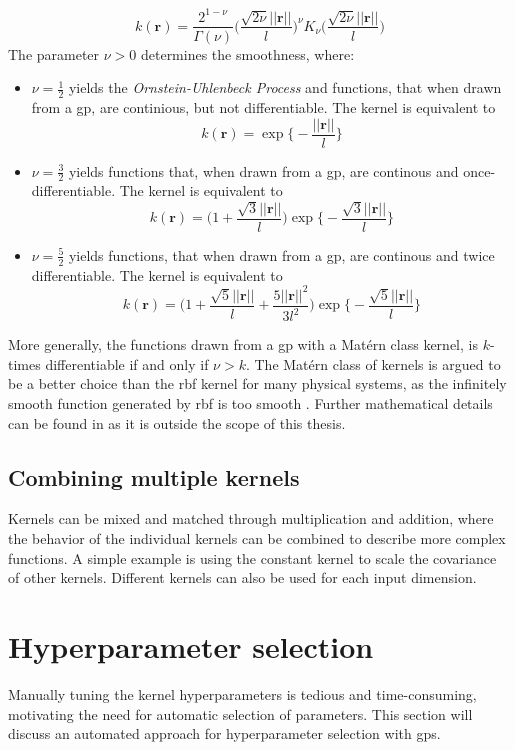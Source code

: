\begin{equation}\label{eq:kernel_matern}
    k(\boldsymbol{r}) = \frac{2^{1-\nu}}{\Gamma(\nu)}\bigg(\frac{\sqrt{2 \nu} ||\boldsymbol{r}||}{l} \bigg)^\nu K_\nu \bigg(\frac{\sqrt{2\nu} || \boldsymbol{r}||}{l} \bigg)
\end{equation}
The parameter $\nu > 0$ determines the smoothness, where:
\begin{itemize}
    \item $\nu=\frac{1}{2}$ yields the \textit{Ornstein-Uhlenbeck Process} and functions, that when drawn from a \acrshort{gp}, are continious, but not differentiable. The kernel is equivalent to $$k(\boldsymbol{r}) = \exp \big\{-\frac{||\boldsymbol{r}||}{l}\big\}$$
    \item $\nu=\frac{3}{2}$ yields functions that, when drawn from a \acrshort{gp}, are continous and once-differentiable. The kernel is equivalent to $$k(\boldsymbol{r}) = \big(1 + \frac{\sqrt{3} ||\boldsymbol{r}||}{l}\big) \exp\big\{- \frac{\sqrt{3} ||\boldsymbol{r}||}{l}\big\}$$
    \item $\nu=\frac{5}{2}$ yields functions, that when drawn from a \acrshort{gp},  are continous and twice differentiable. The kernel is equivalent to $$k(\boldsymbol{r}) = \big(1 + \frac{\sqrt{5} ||\boldsymbol{r}||}{l} + \frac{5 ||\boldsymbol{r}||^2}{3 l^2}\big) \exp\big\{- \frac{\sqrt{5} ||\boldsymbol{r}||}{l}\big\}$$
\end{itemize}
More generally, the functions drawn from a \acrshort{gp} with a Matérn class kernel, is $k$-times differentiable if and only if $\nu > k$\cite{rasmussen}. The Matérn class of kernels is argued to be a better choice than the \acrshort{rbf} kernel for many physical systems, as the infinitely smooth function generated by \acrshort{rbf} is too smooth \cite{rasmussen}.
Further mathematical details can be found in \cite[sec.~4.2]{rasmussen} as it is outside the scope of this thesis.


\subsection{Combining multiple kernels}
Kernels can be mixed and matched through multiplication and addition, where the behavior of the individual kernels can be combined to describe more complex functions. A simple example is using the constant kernel to scale the covariance of other kernels. Different kernels can also be used for each input dimension.
\section{Hyperparameter selection}
Manually tuning the kernel hyperparameters is tedious and time-consuming, motivating the need for automatic selection of parameters. This section will discuss an automated approach for hyperparameter selection with \acrshort{gp}s.

